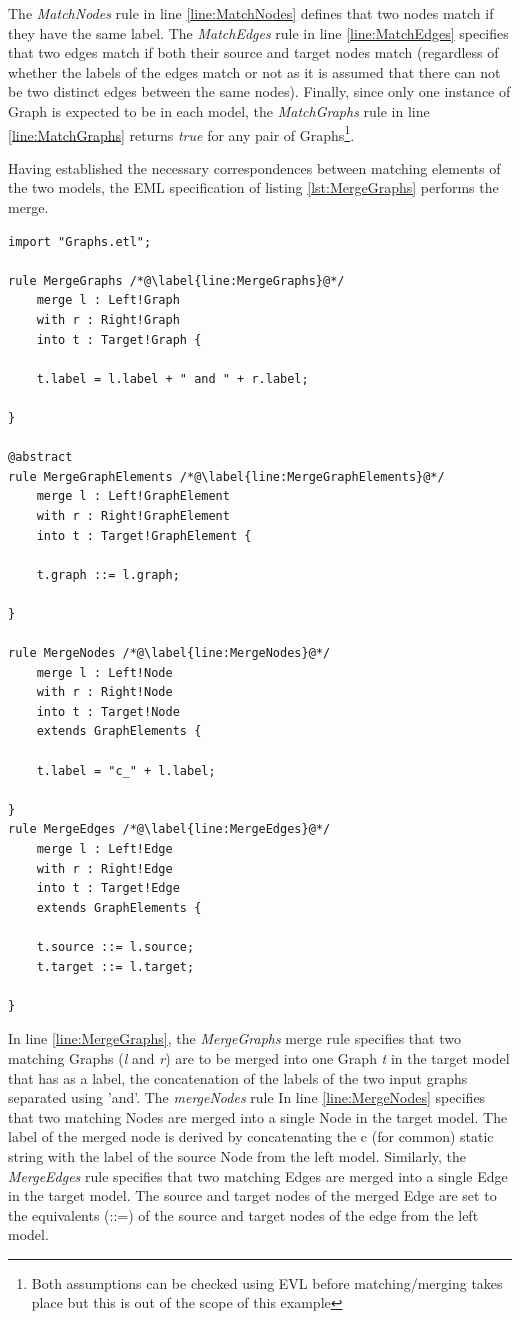 The \emph{MatchNodes} rule in line \ref{line:MatchNodes} defines that two nodes match if they have the same label. The \emph{MatchEdges} rule in line \ref{line:MatchEdges} specifies that two edges match if both their source and target nodes match (regardless of whether the labels of the edges match or not as it is assumed that there can not be two distinct edges between the same nodes). Finally, since only one instance of Graph is expected to be in each model, the \emph{MatchGraphs} rule in line \ref{line:MatchGraphs} returns \emph{true} for any pair of Graphs\footnote{Both assumptions can be checked using EVL before matching/merging takes place but this is out of the scope of this example}.

Having established the necessary correspondences between matching elements of the two models, the EML specification of listing \ref{lst:MergeGraphs} performs the merge.

\begin{lstlisting}[label=lst:MergeGraphs, caption=EML module for merging two instances of the Graph metamodel on the correspondences identified in Listing \ref{lst:CompareGraph} , language=EML]
import "Graphs.etl";

rule MergeGraphs /*@\label{line:MergeGraphs}@*/
	merge l : Left!Graph
	with r : Right!Graph
	into t : Target!Graph {
	
	t.label = l.label + " and " + r.label;
	
}

@abstract
rule MergeGraphElements /*@\label{line:MergeGraphElements}@*/
	merge l : Left!GraphElement
	with r : Right!GraphElement
	into t : Target!GraphElement {
	
	t.graph ::= l.graph;
	
}

rule MergeNodes /*@\label{line:MergeNodes}@*/
	merge l : Left!Node
	with r : Right!Node
	into t : Target!Node 
	extends GraphElements {
	
	t.label = "c_" + l.label;
	
}
rule MergeEdges /*@\label{line:MergeEdges}@*/
	merge l : Left!Edge
	with r : Right!Edge
	into t : Target!Edge 
	extends GraphElements {
	
	t.source ::= l.source;
	t.target ::= l.target;
	
}
\end{lstlisting}

In line \ref{line:MergeGraphs}, the \emph{MergeGraphs} merge rule specifies that two matching Graphs (\emph{l} and \emph{r}) are to be merged into one Graph \emph{t} in the target model that has as a label, the concatenation of the labels of the two input graphs separated using 'and'. The \emph{mergeNodes} rule In line \ref{line:MergeNodes} specifies that two matching Nodes are merged into a single Node in the target model. The label of the merged node is derived by concatenating the c (for common) static string with the label of the source Node from the left model. Similarly, the \emph{MergeEdges} rule specifies that two matching Edges are merged into a single Edge in the target model. The source and target nodes of the merged Edge are set to the equivalents (::=) of the source and target nodes of the edge from the left model.

